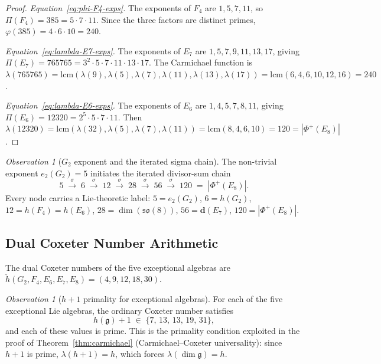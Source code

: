 \documentclass[11pt]{amsart}
\theoremstyle{plain}
\theoremstyle{definition}
\theoremstyle{remark}
\newtheorem{observation}[theorem]{Observation}
\renewcommand{\Phi}{\varPhi}
\begin{document}
\begin{proof}
\textit{Equation~\eqref{eq:phi-F4-exps}.}
The exponents of $F_4$ are $1,5,7,11$, so
$\Pi(F_4) = 385 = 5\cdot 7\cdot 11$.
Since the three factors are distinct primes,
$\varphi(385) = 4\cdot 6\cdot 10 = 240$.

\textit{Equation~\eqref{eq:lambda-E7-exps}.}
The exponents of $E_7$ are $1,5,7,9,11,13,17$, giving
$\Pi(E_7) = 765765 = 3^2 \cdot 5 \cdot 7 \cdot 11 \cdot 13 \cdot 17$.
The Carmichael function is
$\lambda(765765) = \mathrm{lcm}(\lambda(9), \lambda(5),
\lambda(7), \lambda(11), \lambda(13), \lambda(17))
= \mathrm{lcm}(6, 4, 6, 10, 12, 16) = 240$.

\textit{Equation~\eqref{eq:lambda-E6-exps}.}
The exponents of $E_6$ are $1,4,5,7,8,11$, giving
$\Pi(E_6) = 12320 = 2^5 \cdot 5 \cdot 7 \cdot 11$.
Then $\lambda(12320)
= \mathrm{lcm}(\lambda(32), \lambda(5), \lambda(7), \lambda(11))
= \mathrm{lcm}(8, 4, 6, 10) = 120 = |\Phi^+(E_8)|$.
\end{proof}

\begin{observation}[$G_2$ exponent and the iterated sigma chain]%
\label{obs:g2-iterated-sigma}
The non-trivial exponent $e_2(G_2) = 5$ initiates the iterated divisor-sum chain
\[
  5 \;\xrightarrow{\sigma}\; 6 \;\xrightarrow{\sigma}\; 12
    \;\xrightarrow{\sigma}\; 28 \;\xrightarrow{\sigma}\; 56
    \;\xrightarrow{\sigma}\; 120 \;=\; |\Phi^+(E_8)|.
\]
Every node carries a Lie-theoretic label:
$5 = e_2(G_2)$,
$6 = h(G_2)$,
$12 = h(F_4) = h(E_6)$,
$28 = \dim(\mathfrak{so}(8))$,
$56 = \mathbf{d}(E_7)$,
$120 = |\Phi^+(E_8)|$.
\end{observation}

\subsection{Dual Coxeter Number Arithmetic}

The dual Coxeter numbers of the five exceptional algebras are
$\check{h}(G_2, F_4, E_6, E_7, E_8) = (4, 9, 12, 18, 30)$.

\begin{observation}[$h+1$ primality for exceptional algebras]\label{obs:h-plus-1-prime}
For each of the five exceptional Lie algebras, the ordinary Coxeter number
satisfies
\[
  h(\mathfrak{g}) + 1 \;\in\; \{7,\,13,\,13,\,19,\,31\},
\]
and each of these values is prime.  This is the primality condition
exploited in the proof of Theorem~\ref{thm:carmichael} (Carmichael--Coxeter
universality): since $h+1$ is prime, $\lambda(h+1) = h$, which forces
$\lambda(\dim\mathfrak{g}) = h$.
\end{observation}
\end{document}

